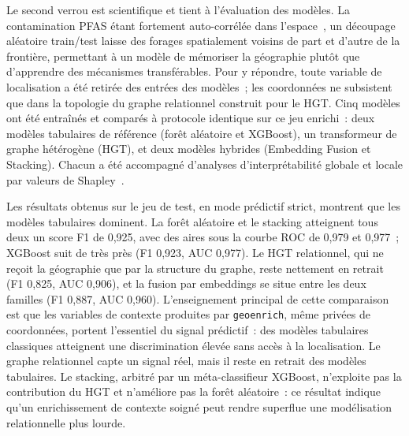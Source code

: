 Le second verrou est scientifique et tient \`a l'\'evaluation des mod\`eles. La contamination PFAS \'etant fortement auto-corr\'el\'ee dans l'espace~\cite{guelfo2021pfas}, un d\'ecoupage al\'eatoire train/test laisse des forages spatialement voisins de part et d'autre de la fronti\`ere, permettant \`a un mod\`ele de m\'emoriser la g\'eographie plut\^ot que d'apprendre des m\'ecanismes transf\'erables. Pour y r\'epondre, toute variable de localisation a \'et\'e retir\'ee des entr\'ees des mod\`eles~; les coordonn\'ees ne subsistent que dans la topologie du graphe relationnel construit pour le HGT. Cinq mod\`eles ont \'et\'e entra\^in\'es et compar\'es \`a protocole identique sur ce jeu enrichi~: deux mod\`eles tabulaires de r\'ef\'erence (for\^et al\'eatoire et XGBoost), un transformeur de graphe h\'et\'erog\`ene (HGT), et deux mod\`eles hybrides (Embedding Fusion et Stacking). Chacun a \'et\'e accompagn\'e d'analyses d'interpr\'etabilit\'e globale et locale par valeurs de Shapley~\cite{lundberg2017shap}.

\label{sec:concl-analyse}

Les r\'esultats obtenus sur le jeu de test, en mode pr\'edictif strict, montrent que les mod\`eles tabulaires dominent. La for\^et al\'eatoire et le stacking atteignent tous deux un score F1 de 0,925, avec des aires sous la courbe ROC de 0,979 et 0,977~; XGBoost suit de tr\`es pr\`es (F1 0,923, AUC 0,977). Le HGT relationnel, qui ne re\c{c}oit la g\'eographie que par la structure du graphe, reste nettement en retrait (F1 0,825, AUC 0,906), et la fusion par embeddings se situe entre les deux familles (F1 0,887, AUC 0,960). L'enseignement principal de cette comparaison est que les variables de contexte produites par \texttt{geoenrich}, m\^eme priv\'ees de coordonn\'ees, portent l'essentiel du signal pr\'edictif~: des mod\`eles tabulaires classiques atteignent une discrimination \'elev\'ee sans acc\`es \`a la localisation. Le graphe relationnel capte un signal r\'eel, mais il reste en retrait des mod\`eles tabulaires. Le stacking, arbitr\'e par un m\'eta-classifieur XGBoost, n'exploite pas la contribution du HGT et n'am\'eliore pas la for\^et al\'eatoire~: ce r\'esultat indique qu'un enrichissement de contexte soign\'e peut rendre superflue une mod\'elisation relationnelle plus lourde.

